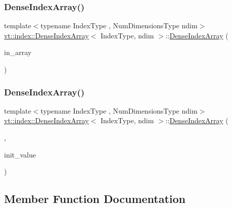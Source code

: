 \subsubsection{\texorpdfstring{Dense\+Index\+Array()}{DenseIndexArray()}\hspace{0.1cm}{\footnotesize\ttfamily [5/6]}}
{\footnotesize\ttfamily template$<$typename Index\+Type , Num\+Dimensions\+Type ndim$>$ \\
\hyperlink{structvt_1_1index_1_1_dense_index_array}{vt\+::index\+::\+Dense\+Index\+Array}$<$ Index\+Type, ndim $>$\+::\hyperlink{structvt_1_1index_1_1_dense_index_array}{Dense\+Index\+Array} (\begin{DoxyParamCaption}\item[{std\+::array$<$ Index\+Type, ndim $>$}]{in\+\_\+array }\end{DoxyParamCaption})}

\mbox{\label{structvt_1_1index_1_1_dense_index_array_aa53dfdb3cad352ad2d1d5701d5a4eb3f}} 
\subsubsection{\texorpdfstring{Dense\+Index\+Array()}{DenseIndexArray()}\hspace{0.1cm}{\footnotesize\ttfamily [6/6]}}
{\footnotesize\ttfamily template$<$typename Index\+Type , Num\+Dimensions\+Type ndim$>$ \\
\hyperlink{structvt_1_1index_1_1_dense_index_array}{vt\+::index\+::\+Dense\+Index\+Array}$<$ Index\+Type, ndim $>$\+::\hyperlink{structvt_1_1index_1_1_dense_index_array}{Dense\+Index\+Array} (\begin{DoxyParamCaption}\item[{Dense\+Index\+Array\+Single\+Init\+Tag}]{,  }\item[{Index\+Type const \&}]{init\+\_\+value }\end{DoxyParamCaption})}



\subsection{Member Function Documentation}
\mbox{\label{structvt_1_1index_1_1_dense_index_array_abe8fc4be882d51e37404e44e87da5caa}} 
